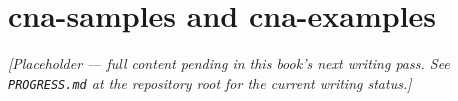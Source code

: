\chapter{cna-samples and cna-examples}
\label{ch:samples-and-examples}

\emph{[Placeholder --- full content pending in this book's next writing pass. See \texttt{PROGRESS.md} at the repository root for the current writing status.]}
